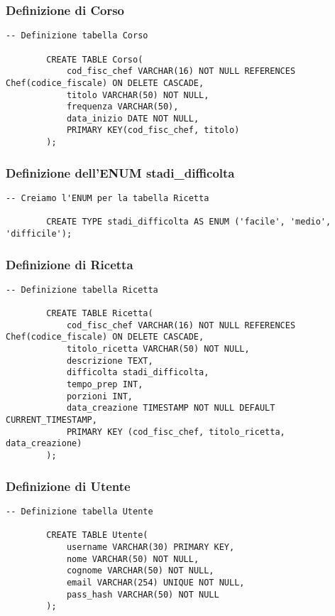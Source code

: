 \documentclass[a4paper, 12pt]{article}
\begin{document}
        \subsubsection{Definizione di Corso}
        \begin{lstlisting}[style=sqlstyle]
        -- Definizione tabella Corso
        
        CREATE TABLE Corso(
            cod_fisc_chef VARCHAR(16) NOT NULL REFERENCES Chef(codice_fiscale) ON DELETE CASCADE,
            titolo VARCHAR(50) NOT NULL,
            frequenza VARCHAR(50),
            data_inizio DATE NOT NULL,
            PRIMARY KEY(cod_fisc_chef, titolo)
        );
        \end{lstlisting}
        \newpage
        \subsubsection{Definizione dell'ENUM stadi\_difficolta}
        \begin{lstlisting}[style=sqlstyle]
        -- Creiamo l'ENUM per la tabella Ricetta
        
        CREATE TYPE stadi_difficolta AS ENUM ('facile', 'medio', 'difficile');
        \end{lstlisting}
        \subsubsection{Definizione di Ricetta}
        \begin{lstlisting}[style=sqlstyle]
        -- Definizione tabella Ricetta
        
        CREATE TABLE Ricetta(
            cod_fisc_chef VARCHAR(16) NOT NULL REFERENCES Chef(codice_fiscale) ON DELETE CASCADE,
            titolo_ricetta VARCHAR(50) NOT NULL,
            descrizione TEXT,
            difficolta stadi_difficolta,
            tempo_prep INT,
            porzioni INT,
            data_creazione TIMESTAMP NOT NULL DEFAULT CURRENT_TIMESTAMP,
            PRIMARY KEY (cod_fisc_chef, titolo_ricetta, data_creazione)
        );
        \end{lstlisting}
        \subsubsection{Definizione di Utente}
        \begin{lstlisting}[style=sqlstyle]
        -- Definizione tabella Utente
        
        CREATE TABLE Utente(
            username VARCHAR(30) PRIMARY KEY,
            nome VARCHAR(50) NOT NULL,
            cognome VARCHAR(50) NOT NULL,
            email VARCHAR(254) UNIQUE NOT NULL,
            pass_hash VARCHAR(50) NOT NULL
        );
        \end{lstlisting}
\end{document}
